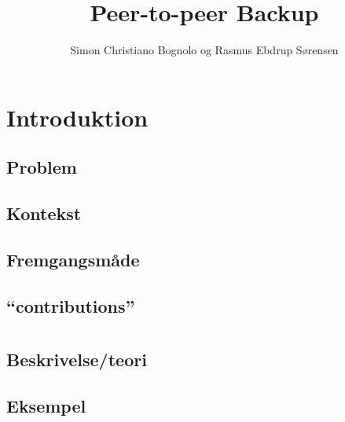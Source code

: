 
\setlength{\cftbeforechapterskip}{1.0em plus 0.1em minus 0.1 em}
\setlength{\cftbeforesectionskip}{0em plus 0em minus 0em}
\setlength{\cftbeforesubsectionskip}{0em plus 0em minus 0em}

\usepackage{biblatex}

\title{Peer-to-peer Backup}
\author{Simon Christiano Bognolo og Rasmus Ebdrup Sørensen}



\frontmatter


\tableofcontents*
\normalsize
\newpage

\listoffixmes
 \newpage
\lstlistoflistings
 \newpage

\savepagenumber
\mainmatter
\linespread{1.5}
\selectfont 

\chapter{Introduktion}
  \section{Problem}	 
  \section{Kontekst}
  \section{Fremgangsmåde}
  \section{``contributions''}

\chapter{\ds}
  \section{Beskrivelse/teori}
  \section{Eksempel}
